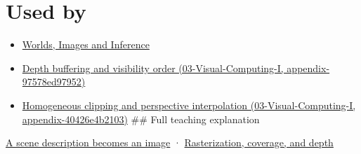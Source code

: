 \section{Used by}\label{appendix-ed3f9bc298fe-used-by}

\begin{itemize}
\item
  \href{Continuous\%20Notes/University\%20-\%20Worlds,\%20Images\%20and\%20Inference\%20-\%20Graphics,\%20Vision\%20and\%20Photography}{Worlds, Images and Inference}
\item
  \href{../03-Visual-Computing-I/main.pdf\#nameddest=appendix-97578ed97952}{Depth buffering and visibility order (03-Visual-Computing-I, appendix-97578ed97952)}
\item
  \href{../03-Visual-Computing-I/main.pdf\#nameddest=appendix-40426e4b2103}{Homogeneous clipping and perspective interpolation (03-Visual-Computing-I, appendix-40426e4b2103)} \#\# Full teaching explanation
\end{itemize}

\href{Continuous\%20Notes/University\%20-\%20Worlds,\%20Images\%20and\%20Inference\%20-\%20Graphics,\%20Vision\%20and\%20Photography\#A\%20scene\%20description\%20becomes\%20an\%20image}{A scene description becomes an image} · \href{Continuous\%20Notes/University\%20-\%20Worlds,\%20Images\%20and\%20Inference\%20-\%20Graphics,\%20Vision\%20and\%20Photography\#Rasterization,\%20coverage,\%20and\%20depth}{Rasterization, coverage, and depth}
